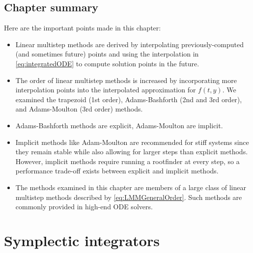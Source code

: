 \documentclass[hidelinks,notitlepage]{book}
\begin{document}
\section{Chapter summary}
Here are the important points made in this chapter:
\begin{itemize}
	\item Linear multistep methods are derived by interpolating previously-computed (and sometimes future) points and using the interpolation in \cref{eq:integratedODE} to compute solution points in the future.
	\item The order of linear multistep methods is increased by incorporating more interpolation points into the interpolated approximation for $f(t, y)$.  We examined the trapezoid (1st order), Adams-Bashforth (2nd and 3rd order), and Adams-Moulton (3rd order) methods.
	\item Adams-Bashforth methods are explicit, Adams-Moulton are implicit.   
	\item Implicit methods like Adam-Moulton are recommended for stiff systems since they remain stable while also allowing for larger steps than explicit methods.  However, implicit methods require running a rootfinder at every step, so a performance trade-off exists between explicit and implicit methods.
	\item The methods examined in this chapter are members of a large class of linear multistep methods described by \cref{eq:LMMGeneralOrder}.  Such methods are commonly provided in high-end ODE solvers.  
\end{itemize}


\chapter{Symplectic integrators}
\label{sect:SymplecticIntegrators}
\end{document}
